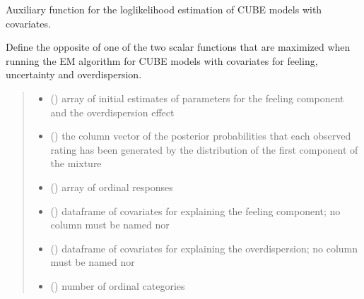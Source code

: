 \documentclass[letterpaper,10pt,english]{sphinxmanual}
\begin{document}
\begin{fulllineitems}
\label{\detokenize{cubmods:cubmods.cube_ywz.Qdue}}
\pysigstartsignatures
{}
\pysigstopsignatures
\sphinxAtStartPar
Auxiliary function for the log\sphinxhyphen{}likelihood estimation of CUBE models with covariates.

\sphinxAtStartPar
Define the opposite of one of the two scalar functions that are maximized when running the E\sphinxhyphen{}M 
algorithm for CUBE models with covariates for feeling, uncertainty and overdispersion.
\begin{quote}\begin{description}
\begin{itemize}
\item {} 
\sphinxAtStartPar
{} () \textendash{} array of initial estimates of parameters for the feeling component and the overdispersion effect

\item {} 
\sphinxAtStartPar
{} () \textendash{} the column vector of the posterior probabilities that each observed rating
has been generated by the distribution of the first component of the mixture

\item {} 
\sphinxAtStartPar
{} () \textendash{} array of ordinal responses

\item {} 
\sphinxAtStartPar
{} () \textendash{} dataframe of covariates for explaining the feeling component;
no column must be named  nor 

\item {} 
\sphinxAtStartPar
{} () \textendash{} dataframe of covariates for explaining the overdispersion;
no column must be named  nor 

\item {} 
\sphinxAtStartPar
{} () \textendash{} number of ordinal categories

\end{itemize}

\end{description}\end{quote}

\end{fulllineitems}
\end{document}
